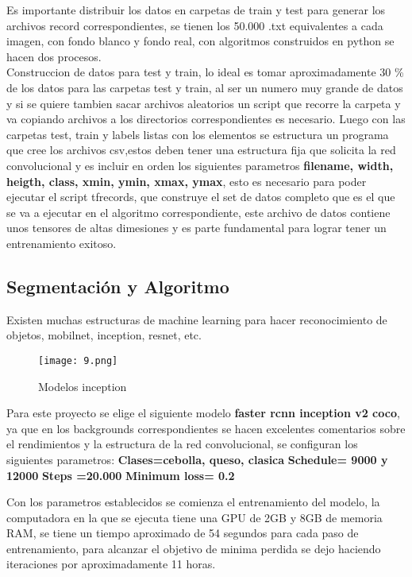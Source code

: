 \documentclass[conference]{IEEEtran}
\begin{document}
Es importante distribuir los datos en carpetas de train y test para generar los archivos record correspondientes, se tienen los 50.000 .txt equivalentes a cada imagen, con fondo blanco y fondo real, con algoritmos construidos en python se hacen dos procesos.\\
Construccion de datos para test y train, lo ideal es tomar aproximadamente 30 \% de los datos para las carpetas test y train, al ser un numero muy grande de datos y si se quiere tambien sacar archivos aleatorios un script que recorre la carpeta y va copiando archivos a los directorios correspondientes es necesario. 
Luego con las carpetas test, train y labels listas con los elementos se estructura un programa que cree los archivos csv,estos deben tener una estructura fija que solicita la red convolucional y es incluir en orden los siguientes parametros \textbf{filename, width, heigth, class, xmin, ymin, xmax, ymax}, esto es necesario para poder ejecutar el script tfrecords, que construye el set de datos completo que es el que se va a ejecutar en el algoritmo correspondiente, este archivo de datos contiene unos tensores de altas dimesiones y es parte fundamental para lograr tener un entrenamiento exitoso.\\
\subsection{Segmentaci\'on y Algoritmo }\label{SCM}
Existen muchas estructuras de machine learning para hacer reconocimiento de objetos, mobilnet, inception, resnet, etc. 
\begin{figure}[H]
	\centering
	\texttt{[image: 9.png]}
	\caption{Modelos inception }
	\label{fig:Resultado GAN}
\end{figure}
Para este proyecto se elige el siguiente modelo \textbf{faster rcnn inception v2 coco}, ya que en los backgrounds correspondientes se hacen excelentes comentarios sobre el rendimientos y la estructura de la red convolucional, se configuran los siguientes parametros:
\subitem \textbf{Clases=cebolla, queso, clasica}
\subitem \textbf{Schedule= 9000 y 12000}
\subitem \textbf{Steps =20.000}
\subitem \textbf{Minimum loss= 0.2}

Con los parametros establecidos se comienza el entrenamiento del modelo, la computadora en la que se ejecuta tiene una GPU de 2GB y 8GB de memoria RAM, se tiene un tiempo aproximado de 54 segundos para cada paso de entrenamiento, para alcanzar el objetivo de minima perdida se dejo haciendo iteraciones por aproximadamente 11 horas. 
\end{document}

